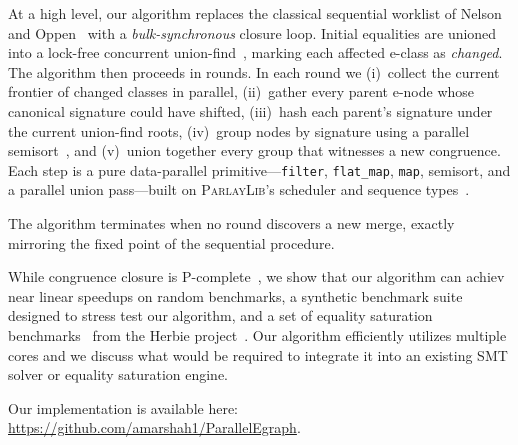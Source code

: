 At a high level, our algorithm replaces the classical sequential worklist of
Nelson and Oppen~\cite{nelson-oppen-cc} with a \emph{bulk-synchronous} closure
loop.
Initial equalities are unioned into a lock-free concurrent
union-find~\cite{jayanti16}, marking each affected e-class as \emph{changed}.
The algorithm then proceeds in rounds. In each round we (i)~collect the current
frontier of changed classes in parallel, (ii)~gather every parent e-node whose
canonical signature could have shifted, (iii)~hash each parent's signature under
the current union-find roots, (iv)~group nodes by signature using a parallel
semisort~\cite{semisort}, and (v)~union together every group that witnesses a
new congruence. Each step is a pure data-parallel primitive—\texttt{filter},
\texttt{flat\_map}, \texttt{map}, semisort, and a parallel union pass—built on
\textsc{ParlayLib}'s scheduler and sequence types~\cite{parlaylib}. 

The algorithm terminates when no round discovers a new merge, exactly mirroring the
fixed point of the sequential procedure. 

While congruence closure is P-complete~\cite{ccpcomplete}, we show that our
algorithm can achiev near linear speedups on random benchmarks, a synthetic
benchmark suite designed to stress test our algorithm, and a set of equality
saturation benchmarks~\cite{eqsat} from the Herbie project~\cite{herbie}. Our
algorithm efficiently utilizes multiple cores and we discuss what would
be required to integrate it into an existing SMT solver or equality saturation
engine. 

Our implementation is available here: \url{https://github.com/amarshah1/ParallelEgraph}.
